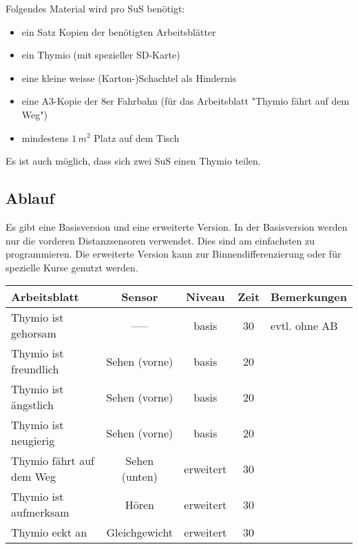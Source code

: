 \documentclass[12pt]{article}
\begin{document}
Folgendes Material wird pro SuS benötigt:

\begin{itemize}
\item ein Satz Kopien der benötigten Arbeitsblätter
\item ein Thymio (mit spezieller SD-Karte)
\item eine kleine weisse (Karton-)Schachtel als Hindernis
\item eine A3-Kopie der 8er Fahrbahn (für das Arbeitsblatt "Thymio fährt auf dem Weg")
\item mindestens $1\,m^2$ Platz auf dem Tisch 
\end{itemize}

Es ist auch möglich, dass sich zwei SuS einen Thymio teilen.


\subsection*{Ablauf}

Es gibt eine Basisversion und eine erweiterte Version. In der Basisversion werden nur die vorderen Distanzsensoren verwendet. Dies sind am einfachsten zu programmieren. Die erweiterte Version kann zur Binnendifferenzierung oder für spezielle Kurse genutzt werden.

\begin{center}
\begin{tabular}{|l|c|c|c|p{3cm}|}
\hline
{\bf Arbeitsblatt} &{\bf Sensor} &{\bf Niveau}&{\bf Zeit} &{\bf Bemerkungen}\\\hline
Thymio ist gehorsam & ----- & basis & 30&evtl. ohne AB\\\hline
Thymio ist freundlich  &Sehen (vorne) & basis&20&\\\hline
Thymio ist ängstlich  &Sehen (vorne) & basis&20 &\\\hline
Thymio ist neugierig &Sehen (vorne)  & basis &20 &\\\hline
Thymio fährt auf dem Weg & Sehen (unten) & erweitert&30&\\\hline
Thymio ist aufmerksam & Hören & erweitert&30&\\\hline
Thymio eckt an & Gleichgewicht & erweitert&30&\\\hline
\end{tabular}
\end{center}
\end{document}
